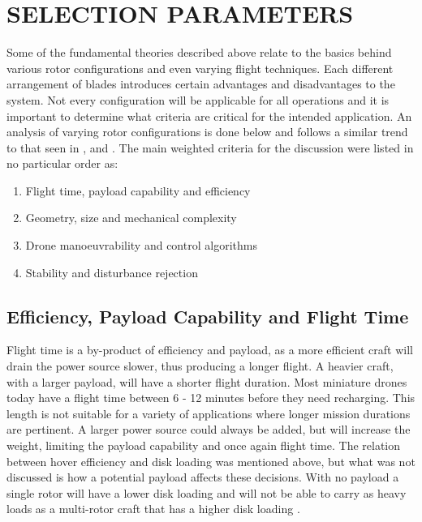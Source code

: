\documentclass[a4paper, 10pt, conference]{ieeeconf}
\begin{document}
\section{SELECTION PARAMETERS}
Some of the fundamental theories described above relate to the basics behind various rotor configurations and even varying flight techniques. Each different arrangement of blades introduces certain advantages and disadvantages to the system. Not every configuration will be applicable for all operations and it is important to determine what criteria are critical for the intended application.  An analysis of varying rotor configurations is done below and follows a similar trend to that seen in \cite{RotorConfig}, \cite{Bohorquez} and \cite{NewMAV}. The main weighted criteria for the discussion were listed in no particular order as:

\begin{enumerate}
	\item Flight time, payload capability and efficiency
	\item Geometry, size and mechanical complexity
	\item Drone manoeuvrability and control algorithms
	\item Stability and disturbance rejection
\end{enumerate}

\subsection{Efficiency, Payload Capability and Flight Time} 
Flight time is a by-product of efficiency and payload, as a more efficient craft will drain the power source slower, thus producing a longer flight. A heavier craft, with a larger payload, will have a shorter flight duration. Most miniature drones today have a flight time between 6 - 12 minutes before they need recharging. This length is not suitable for a variety of applications where longer mission durations are pertinent. A larger power source could always be added, but will increase the weight, limiting the payload capability and once again flight time. The relation between hover efficiency and disk loading was mentioned above, but what was not discussed is how a potential payload affects these decisions. With no payload a single rotor will have a lower disk loading and will not be able to carry as heavy loads as a multi-rotor craft that has a higher disk loading \cite{Leishman, Camrad, RotorCraftHand}.
\end{document}
